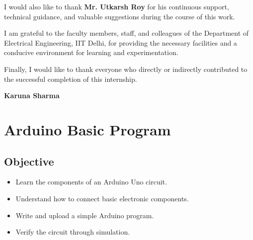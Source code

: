 \documentclass[12pt,a4paper]{report}
\begin{document}
\begin{justify}
I would also like to thank \textbf{Mr. Utkarsh Roy} for his continuous support, technical guidance, and valuable suggestions during the course of this work.
\end{justify}

\begin{justify}
I am grateful to the faculty members, staff, and colleagues of the Department of Electrical Engineering, IIT Delhi, for providing the necessary facilities and a conducive environment for learning and experimentation.
\end{justify}

Finally, I would like to thank everyone who directly or indirectly contributed to the successful completion of this internship.

\vspace{2cm}

\begin{flushright}
\textbf{Karuna Sharma}
\end{flushright}

\newpage

\tableofcontents

\newpage


\chapter{Arduino Basic Program}

\section {Objective}

\begin{itemize}

\item Learn the components of an Arduino Uno circuit.

\item Understand how to connect basic electronic components.

\item Write and upload a simple Arduino program.

\item Verify the circuit through simulation.

\end{itemize}
\end{document}
